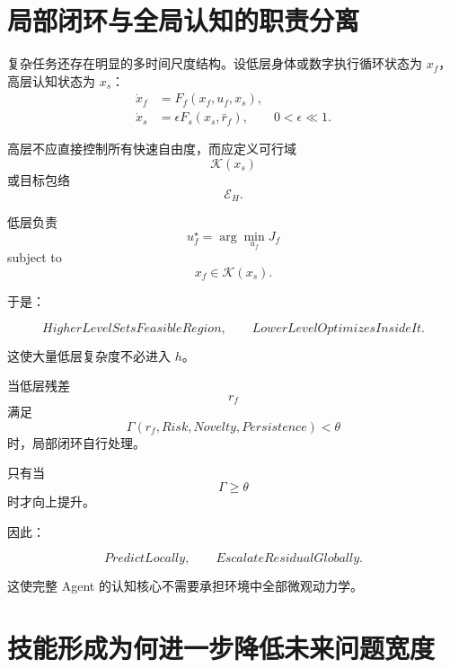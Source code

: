 \section{局部闭环与全局认知的职责分离}

复杂任务还存在明显的多时间尺度结构。设低层身体或数字执行循环状态为 $x_f$，高层认知状态为 $x_s$：
\begin{align}
\dot x_f
&=
F_f(x_f,u_f,x_s),\\
\dot x_s
&=
\epsilon F_s(x_s,\bar r_f),
\qquad
0<\epsilon\ll 1.
\end{align}

高层不应直接控制所有快速自由度，而应定义可行域
\begin{equation}
\mathcal K(x_s)
\end{equation}
或目标包络
\begin{equation}
\mathcal E_H.
\end{equation}

低层负责
\begin{equation}
u_f^\star
=
\arg\min_{u_f}
J_f
\end{equation}
subject to
\begin{equation}
x_f\in\mathcal K(x_s).
\end{equation}

于是：

\begin{equation}
\boxed{
HigherLevelSetsFeasibleRegion,
\qquad
LowerLevelOptimizesInsideIt.
}
\end{equation}

这使大量低层复杂度不必进入 $h$。

当低层残差
\begin{equation}
r_f
\end{equation}
满足
\begin{equation}
\Gamma(r_f,Risk,Novelty,Persistence)
<
\theta
\end{equation}
时，局部闭环自行处理。

只有当
\begin{equation}
\Gamma
\geq
\theta
\end{equation}
时才向上提升。

因此：

\begin{equation}
\boxed{
PredictLocally,
\qquad
EscalateResidualGlobally.
}
\end{equation}

这使完整 Agent 的认知核心不需要承担环境中全部微观动力学。

\section{技能形成为何进一步降低未来问题宽度}

